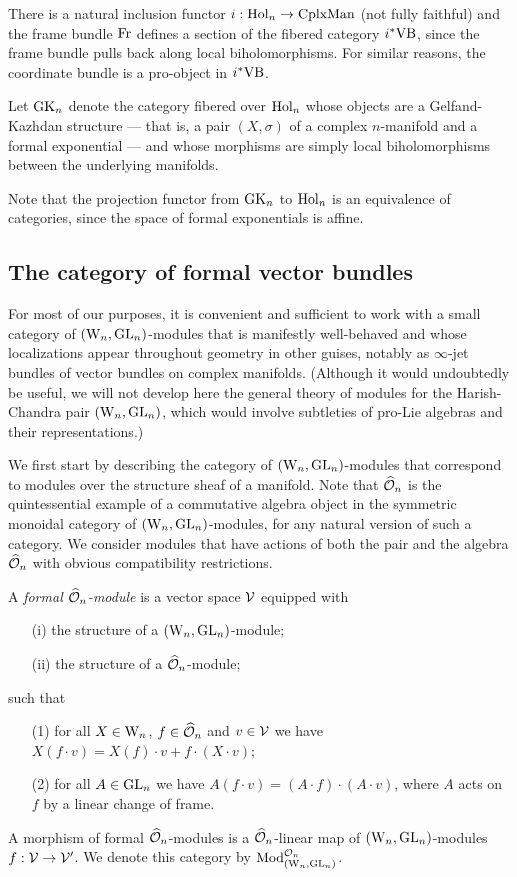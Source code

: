 \documentclass[10pt]{amsart}
\begin{document}
There is a natural inclusion functor $i : {\rm Hol}_n \to {\rm CplxMan}$ (not fully faithful) and the frame bundle ${\rm Fr}$ defines a section of the fibered category $i^*{\rm VB}$,
since the frame bundle pulls back along local biholomorphisms.
For similar reasons, the coordinate bundle is a pro-object in $i^*{\rm VB}$.

\begin{dfn}
Let ${\rm GK}_n$ denote the category fibered over ${\rm Hol}_n$ whose objects are a Gelfand-Kazhdan structure 
--- that is, a pair $(X, \sigma)$ of a complex $n$-manifold and a formal exponential ---
and whose morphisms are simply local biholomorphisms between the underlying manifolds.
\end{dfn}

Note that the projection functor from ${\rm GK}_n$ to ${\rm Hol}_n$ is an equivalence of categories, since the space of formal exponentials is affine.

\subsection{The category of formal vector bundles}

For most of our purposes, it is convenient and sufficient to work with a small category of $({{\rm W}_n},{\rm GL}_n)$-modules 
that is manifestly well-behaved and whose localizations appear throughout geometry in other guises, 
notably as $\infty$-jet bundles of vector bundles on complex manifolds.
(Although it would undoubtedly be useful, we will not develop here the general theory of modules for the Harish-Chandra pair $({{\rm W}_n},{\rm GL}_n)$, 
which would involve subtleties of pro-Lie algebras and their representations.)

We first start by describing the category of $({{\rm W}_n}, {\rm GL}_n)$-modules
that correspond to modules over the structure sheaf of a manifold. Note that $\widehat{\mathcal O}_n$ is the quintessential example of a commutative algebra object in the symmetric monoidal category of $({{\rm W}_n},{\rm GL}_n)$-modules, 
for any natural version of such a category. We consider modules that
have actions of both the pair and the algebra $\widehat{\mathcal O}_n$ with obvious
compatibility restrictions. 

\begin{dfn} A {\em formal $\widehat{\mathcal O}_n$-module} is a
  vector space $\mathcal{V}$ equipped with
\begin{itemize}
\item[(i)] the structure of a $({{\rm W}_n}, {\rm GL}_n)$-module;
\item[(ii)] the structure of a $\widehat{\mathcal O}_n$-module;
\end{itemize}
such that 
\begin{itemize}
\item[(1)] for all $X \in {{\rm W}_n}$, $f \in \widehat{\mathcal O}_n$ and $v \in \mathcal{V}$ we
  have $X(f \cdot v) = X(f) \cdot v + f \cdot (X \cdot v)$;
\item[(2)] for all $A \in {\rm GL}_n$ we have $A (f \cdot v) = (A \cdot f) \cdot (A \cdot v)$,  where $A$ acts on $f$ by a linear change of frame.
\end{itemize}
A morphism of formal $\widehat{\mathcal O}_n$-modules is a $\widehat{\mathcal O}_n$-linear map of
$({{\rm W}_n}, {\rm GL}_n)$-modules $f : \mathcal{V} \to \mathcal{V}'$. We denote this category
by ${\rm Mod}_{({{\rm W}_n}, {\rm GL}_n)}^{\mathcal O_n}$. 
\end{dfn}
\end{document}
